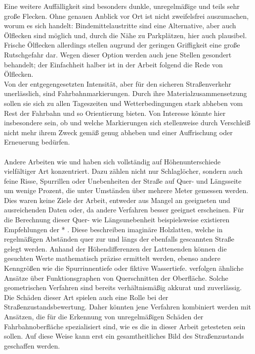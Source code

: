 Eine weitere Auffälligkeit sind besonders dunkle, unregelmäßige und teils sehr große Flecken. Ohne genauen Anblick vor Ort ist nicht zweifelsfrei auszumachen, worum es sich handelt: Bindemittelaustritte sind eine Alternative, aber auch Ölflecken sind möglich und, durch die Nähe zu Parkplätzen, hier auch plausibel. Frische Ölflecken allerdings stellen augrund der geringen Griffigkeit eine große Rutschgefahr dar. Wegen dieser Option werden auch jene Stellen gesondert behandelt; der Einfachheit halber ist in der Arbeit folgend die Rede von Ölflecken. \\
Von der entgegengesetzten Intensität, aber für den sicheren Straßenverkehr unerlässlich, sind Fahrbahnmarkierungen. Durch ihre Materialzusammensetzung sollen sie sich zu allen Tageszeiten und Wetterbedingungen stark abheben vom Rest der Fahrbahn und so Orientierung bieten. Von Interesse könnte hier insbesondere sein, ob und welche Markierungen sich stellenweise durch Verschleiß nicht mehr ihrem Zweck gemäß genug abheben und einer Auffrischung oder Erneuerung bedürfen. \\\\
Andere Arbeiten wie \cite{Zhiqiang.etal-2019} und \cite{Famili.etal-2021} haben sich vollständig auf Höhenunterschiede vielfältiger Art konzentriert. Dazu zählen nicht nur Schlaglöcher, sondern auch feine Risse, Spurrillen oder Unebenheiten der Straße auf Quer- und Längsseite um wenige Prozent, die unter Umständen über mehrere Meter gemessen werden. Dies waren keine Ziele der Arbeit, entweder aus Mangel an geeigneten und ausreichenden Daten oder, da andere Verfahren besser geeignet erscheinen. Für die Berechnung dieser Quer- wie Längsunebenheit beispielsweise existieren Empfehlungen der * . Diese beschreiben imaginäre Holzlatten, welche in regelmäßigen Abständen quer zur und längs der ebenfalls gescannten Straße gelegt werden. Anhand der Höhendifferenzen der Lattenenden können die gesuchten Werte mathematisch präzise ermittelt werden, ebenso andere Kenngrößen wie die Spurrinnentiefe oder fiktive Wassertiefe. \cite{Famili.etal-2021} verfolgen ähnliche Ansätze über Funktionsgraphen von Querschnitten der Oberfläche. Solche geometrischen Verfahren sind bereits verhältnismäßig akkurat und zuverlässig. \\ 
Die Schäden dieser Art spielen auch eine Rolle bei der Straßenzustandsbewertung. Daher könnten jene Verfahren kombiniert werden mit Ansätzen, die für die Erkennung von unregelmäßigen Schäden der Fahrbahnoberfläche spezialisiert sind, wie es die in dieser Arbeit getesteten sein sollen. Auf diese Weise kann erst ein gesamtheitliches Bild des Straßenzustands geschaffen werden.

